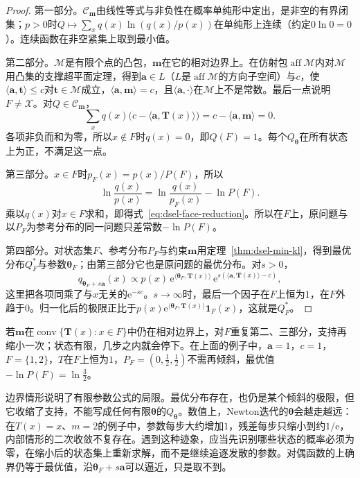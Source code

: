 \begin{proof}
第一部分。$\mathcal{C}_{\bm{m}}$由线性等式与非负性在概率单纯形中定出，是非空的有界闭集；$p>0$时$Q\mapsto\sum_xq(x)\ln(q(x)/p(x))$在单纯形上连续（约定$0\ln0=0$）。连续函数在非空紧集上取到最小值。

第二部分。$\mathcal{M}$是有限个点的凸包，$\bm{m}$在它的相对边界上。在仿射包$\operatorname{aff}\mathcal{M}$内对$\mathcal{M}$用凸集的支撑超平面定理，得到$\bm{a}\in L$（$L$是$\operatorname{aff}\mathcal{M}$的方向子空间）与$c$，使$\langle\bm{a},\bm{t}\rangle\leq c$对$\bm{t}\in\mathcal{M}$成立，$\langle\bm{a},\bm{m}\rangle=c$，且$\langle\bm{a},\cdot\rangle$在$\mathcal{M}$上不是常数。最后一点说明$F\neq\mathcal{X}$。对$Q\in\mathcal{C}_{\bm{m}}$，
\[
 \sum_xq(x)\bigl(c-\langle\bm{a},\bm{T}(x)\rangle\bigr)=c-\langle\bm{a},\bm{m}\rangle=0 .
\]
各项非负而和为零，所以$x\notin F$时$q(x)=0$，即$Q(F)=1$。每个$Q_{\bm{\theta}}$在所有状态上为正，不满足这一点。

第三部分。$x\in F$时$p_F(x)=p(x)/P(F)$，所以
\[
 \ln\frac{q(x)}{p(x)}=\ln\frac{q(x)}{p_F(x)}-\ln P(F) .
\]
乘以$q(x)$对$x\in F$求和，即得式~\eqref{eq:dsel-face-reduction}。所以在$F$上，原问题与以$P_F$为参考分布的同一问题只差常数$-\ln P(F)$。

第四部分。对状态集$F$、参考分布$P_F$与约束$\bm{m}$用定理~\ref{thm:dsel-min-kl}，得到最优分布$Q^{*}_F$与参数$\bm{\theta}_F$；由第三部分它也是原问题的最优分布。对$s>0$，
\[
 q_{\bm{\theta}_F+s\bm{a}}(x)\propto p(x)\,\mathrm{e}^{\langle\bm{\theta}_F,\bm{T}(x)\rangle}\,\mathrm{e}^{s(\langle\bm{a},\bm{T}(x)\rangle-c)} ,
\]
这里把各项同乘了与$x$无关的$\mathrm{e}^{-sc}$。$s\to\infty$时，最后一个因子在$F$上恒为$1$，在$F$外趋于$0$。归一化后的极限正比于$p(x)\mathrm{e}^{\langle\bm{\theta}_F,\bm{T}(x)\rangle}\mathbf{1}_F(x)$，这就是$Q^{*}_F$。
\end{proof}

若$\bm{m}$在$\operatorname{conv}\{\bm{T}(x):x\in F\}$中仍在相对边界上，对$F$重复第二、三部分，支持再缩小一次；状态有限，几步之内就会停下。在上面的例子中，$\bm{a}=1$，$c=1$，$F=\{1,2\}$，$T$在$F$上恒为$1$，$P_F=(0,\tfrac12,\tfrac12)$不需再倾斜，最优值$-\ln P(F)=\ln\tfrac32$。

边界情形说明了有限参数公式的局限。最优分布存在，也仍是某个倾斜的极限，但它收缩了支持，不能写成任何有限$\bm{\theta}$的$Q_{\bm{\theta}}$。数值上，Newton迭代的$\bm{\theta}$会越走越远：在$T(x)=x$、$m=2$的例子中，参数每步大约增加$1$，残差每步只缩小到约$1/\mathrm{e}$，内部情形的二次收敛不复存在。遇到这种迹象，应当先识别哪些状态的概率必须为零，在缩小后的状态集上重新求解，而不是继续追逐发散的参数。对偶函数的上确界仍等于最优值，沿$\bm{\theta}_F+s\bm{a}$可以逼近，只是取不到。
